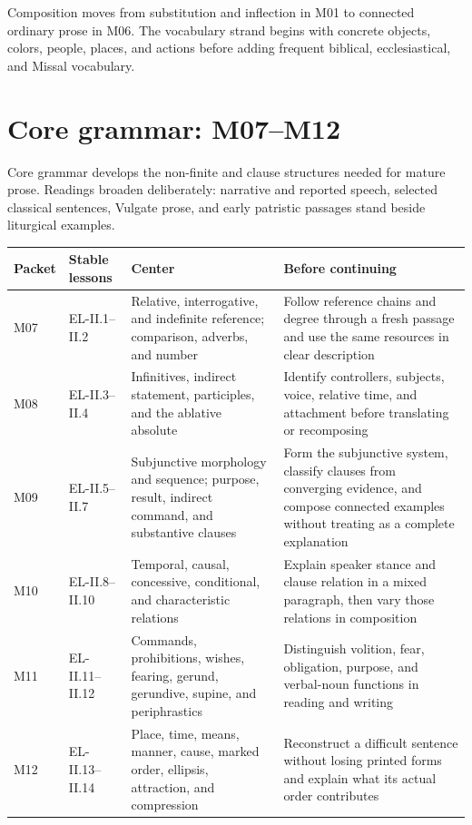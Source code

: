 Composition moves from substitution and inflection in M01 to connected
ordinary prose in M06. The vocabulary strand begins with concrete objects,
colors, people, places, and actions before adding frequent biblical,
ecclesiastical, and Missal vocabulary.

\section{Core grammar: M07--M12}

Core grammar develops the non-finite and clause structures needed for mature
prose. Readings broaden deliberately: narrative and reported speech, selected
classical sentences, Vulgate prose, and early patristic passages stand beside
liturgical examples.

\begin{xltabular}{\linewidth}{@{}P{0.55in}P{1.1in}P{2.0in}Y@{}}
  \toprule
  \textbf{Packet} & \textbf{Stable lessons} & \textbf{Center} & \textbf{Before continuing} \\
  \midrule\endhead
  M07 & EL-II.1--II.2 & Relative, interrogative, and indefinite reference;
  comparison, adverbs, and number & Follow reference chains and degree through
  a fresh passage and use the same resources in clear description \\
  M08 & EL-II.3--II.4 & Infinitives, indirect statement, participles, and the
  ablative absolute & Identify controllers, subjects, voice, relative time,
  and attachment before translating or recomposing \\
  M09 & EL-II.5--II.7 & Subjunctive morphology and sequence; purpose, result,
  indirect command, and substantive clauses & Form the subjunctive system,
  classify clauses from converging evidence, and compose connected examples
  without treating  as a complete explanation \\
  M10 & EL-II.8--II.10 & Temporal, causal, concessive, conditional, and
  characteristic relations & Explain speaker stance and clause relation in a
  mixed paragraph, then vary those relations in composition \\
  M11 & EL-II.11--II.12 & Commands, prohibitions, wishes, fearing, gerund,
  gerundive, supine, and periphrastics & Distinguish volition, fear,
  obligation, purpose, and verbal-noun functions in reading and writing \\
  M12 & EL-II.13--II.14 & Place, time, means, manner, cause, marked order,
  ellipsis, attraction, and compression & Reconstruct a difficult sentence
  without losing printed forms and explain what its actual order contributes \\
  \bottomrule
\end{xltabular}

